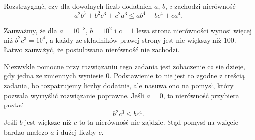 \begin{problem}{5}
	Rozstrzygnąć, czy dla dowolnych liczb dodatnich $a$, $b$, $c$ zachodzi nierówność
	\[
		a^2b^3 + b^2c^3 + c^2a^3 \leqslant ab^4 + bc^4 + ca^4.
	\]
\end{problem}

\noindent
Zauważmy, że dla $a = 10^{-8}$, $b = 10^{2}$ i  $c = 1$ lewa strona nierówności wynosi więcej niż $b^2c^3 = 10^{4}$, a każdy ze składników prawej strony jest nie większy niż $100$. Łatwo zauważyć, że postulowana nierówność nie zachodzi.

\begin{remark}
	Niezwykle pomocne przy rozwiązaniu tego zadania jest zobaczenie co się dzieje, gdy jedna ze zmiennych wyniesie $0$. Podstawienie to nie jest to zgodne z treścią zadania, bo rozpatrujemy liczby dodatnie, ale nasuwa ono na pomysł, który pozwala wymyślić rozwiązanie poprawne. Jeśli $a = 0$, to nierówność przybiera postać
	\[
		b^2c^3 \leqslant bc^4.
	\]
	Jeśli $b$ jest większe niż $c$ to ta nierówność nie zajdzie. Stąd pomysł na wzięcie bardzo małego $a$ i dużej liczby $c$.
\end{remark}

